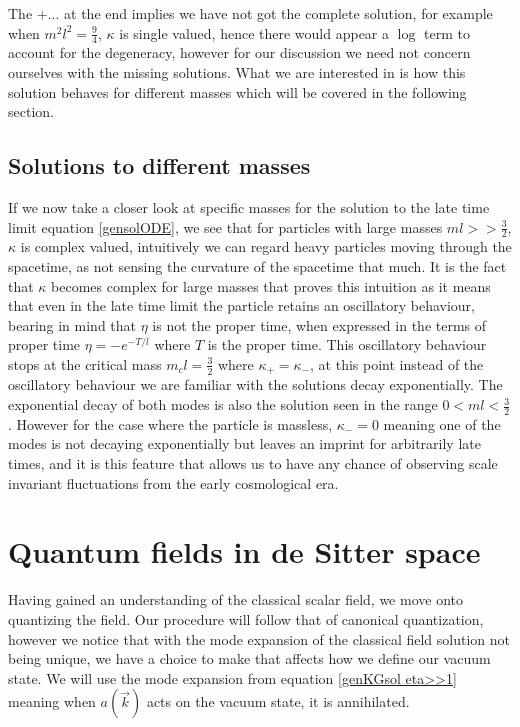 \documentclass[a4paper,11pt]{article}
\numberwithin{equation}{section}
\numberwithin{figure}{section}
\begin{document}
\begin{large}
The $+...$ at the end implies we have not got the complete solution, for example when $m^2l^2=\frac{9}{4}$, $\kappa$ is single valued, hence there would appear a $\log$ term to account for the degeneracy, however for our discussion we need not concern ourselves with the missing solutions. What we are interested in is how this solution behaves for different masses which will be covered in the following section.


\subsection{Solutions to different masses}

If we now take a closer look at specific masses for the solution to the late time limit equation \eqref{gensolODE}, we see that for particles with large masses  $ml>>\frac{3}{2}$, $\kappa$ is complex valued, intuitively we can regard heavy particles moving through the spacetime, as not sensing the curvature of the spacetime that much. It is the fact that $\kappa$ becomes complex for large masses that proves this intuition as it means that even in the late time limit the particle retains an oscillatory behaviour, bearing in mind that $\eta$ is not the proper time, when expressed in the terms of proper time $\eta=-e^{-T/l}$ where $T$ is the proper time. This oscillatory behaviour stops at the critical mass $m_cl=\frac{3}{2}$ where $\kappa_+=\kappa_-$, at this point instead of the oscillatory behaviour we are familiar with the solutions decay exponentially. The exponential decay of both modes is also the solution seen in the range $0<ml<\frac{3}{2}$. However for the case where the particle is massless, $\kappa_-=0$ meaning one of the modes is not decaying exponentially but leaves an imprint for arbitrarily late times, and it is this feature that allows us to have any chance of observing scale invariant fluctuations from the early cosmological era.




\newpage

\section{Quantum fields in de Sitter space}

Having gained an understanding of the classical scalar field, we move onto quantizing the field. Our procedure will follow that of canonical quantization,
however we notice that with the mode expansion of the classical field solution not being unique, we have a choice to make that affects how we define our vacuum state. We will use the mode expansion from equation \eqref{genKGsol eta>>1} meaning when $a(\Vec{k})$ acts on the vacuum state, it is annihilated.



\end{large}
\end{document}
